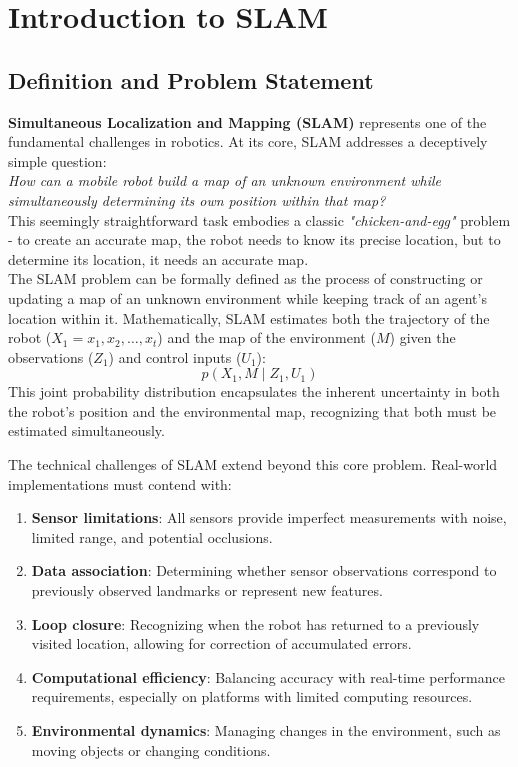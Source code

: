\documentclass[12pt]{article}
\begin{document}
    \newpage

    \tableofcontents

    \newpage

    \section{Introduction to SLAM}
    \subsection{Definition and Problem Statement}
    \textbf{Simultaneous Localization and Mapping (SLAM)} represents one of the fundamental challenges in robotics. At its core, SLAM addresses a deceptively simple question: 
    \\ \textit{How can a mobile robot build a map of an unknown environment while simultaneously determining its own position within that map?} 
    \\ This seemingly straightforward task embodies a classic \textit{"chicken-and-egg"} problem - to create an accurate map, the robot needs to know its precise location,
    but to determine its location, it needs an accurate map.
    \\ The SLAM problem can be formally defined as the process of constructing or updating a map of an unknown environment while keeping track of an agent's location within it. 
    Mathematically, SLAM estimates both the trajectory of the robot ($X_{1} = {x_1, x_2, \ldots, x_t}$) and the map of the environment ($M$) given the observations ($Z_{1}$) and control inputs ($U_{1}$):
    \[p(X_{1}, M \mid Z_{1}, U_{1})\]
    This joint probability distribution encapsulates the inherent uncertainty in both the robot's position and the environmental map, recognizing that both must be estimated simultaneously.

    \newpage

    The technical challenges of SLAM extend beyond this core problem. Real-world implementations must contend with:
    \begin{enumerate}
        \item \textbf{Sensor limitations}: All sensors provide imperfect measurements with noise, limited range, and potential occlusions.
        \item \textbf{Data association}: Determining whether sensor observations correspond to previously observed landmarks or represent new features.
        \item \textbf{Loop closure}: Recognizing when the robot has returned to a previously visited location, allowing for correction of accumulated errors.
        \item \textbf{Computational efficiency}: Balancing accuracy with real-time performance requirements, especially on platforms with limited computing resources.
        \item \textbf{Environmental dynamics}: Managing changes in the environment, such as moving objects or changing conditions.
    \end{enumerate}
\end{document}
